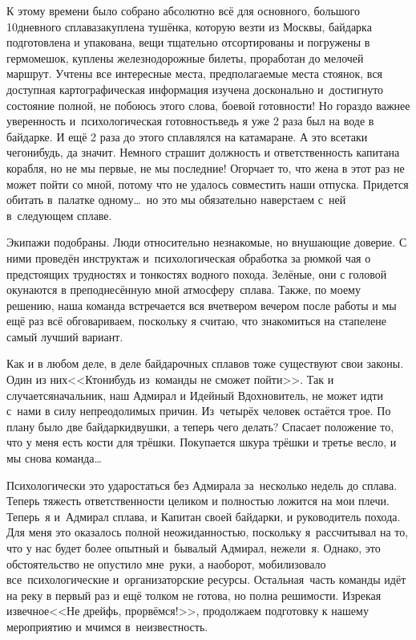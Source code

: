 К этому времени было собрано абсолютно всё для основного, большого 10\sdash дневного сплава\mdash закуплена тушёнка, которую везти из Москвы, байдарка подготовлена и упакована, вещи тщательно отсортированы и погружены в гермомешок, куплены железнодорожные билеты, проработан до мелочей маршрут. Учтены все интересные места, предполагаемые места стоянок, вся доступная картографическая информация изучена досконально и~достигнуто состояние полной, не побоюсь этого слова, боевой готовности! Но гораздо  важнее уверенность и~психологическая готовность\mdash ведь я уже 2 раза был на воде в байдарке. И ещё 2 раза до этого сплавлялся на катамаране. А это все\sdash таки чего\sdash нибудь, да значит. Немного страшит должность и ответственность капитана корабля, но не мы первые, не мы последние! Огорчает то, что жена в этот раз не может пойти со мной, потому что не удалось совместить наши отпуска. Придется обитать в~палатке одному\ldots~но это мы обязательно наверстаем с~ней в~следующем сплаве. 

Экипажи подобраны. Люди относительно незнакомые, но внушающие доверие. С ними проведён инструктаж и~психологическая обработка за рюмкой чая о предстоящих трудностях и тонкостях водного похода. Зелёные, они с головой окунаются в преподнесённую мной атмосферу~сплава. Также, по моему решению, наша команда встречается вся вчетвером вечером после работы и мы ещё раз всё обговариваем, поскольку я считаю, что знакомиться на стапеле\mdash не самый лучший вариант.

Как и в любом деле, в деле байдарочных сплавов тоже существуют свои законы. Один из них\mdash <<Кто\sdash нибудь из~команды не сможет пойти>>. Так и случается\mdash начальник, наш Адмирал и Идейный Вдохновитель, не может идти с~нами в силу непреодолимых причин. Из~четырёх человек остаётся трое. По плану было две байдарки\sdash двушки, а теперь чего делать? Спасает положение то, что у меня есть кости для трёшки. Покупается шкура трёшки и третье весло, и мы снова команда\ldots
 
Психологически это удар\mdash остаться без Адмирала за~несколько недель до сплава. Теперь тяжесть ответственности целиком и полностью ложится на мои плечи. Теперь~я и~Адмирал сплава, и Капитан своей байдарки, и руководитель похода. Для меня это оказалось полной неожиданностью, поскольку я~рассчитывал на то, что у нас будет более опытный и~бывалый Адмирал, нежели~я. Однако, это обстоятельство не опустило мне~руки, а наоборот, мобилизовало все~психологические и~организаторские ресурсы. Остальная~часть команды идёт на реку в первый раз и ещё толком не готова, но полна решимости. Изрекая извечное\mdash <<Не дрейфь, прорвёмся!>>, продолжаем подготовку к нашему мероприятию и мчимся в~неизвестность. 

\begin{center}
\end{center}